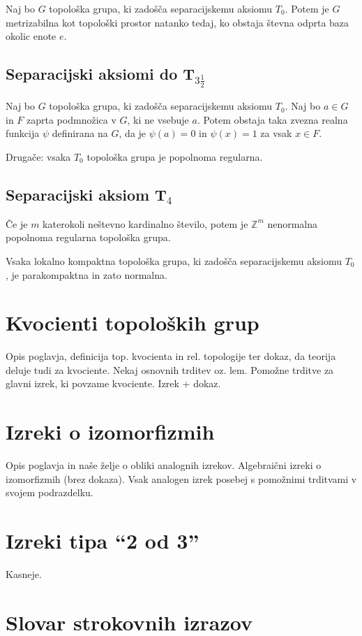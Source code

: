 \documentclass[mat1]{fmfdelo}
\newcommand{\Z}{\mathbb Z}
\begin{document}
\begin{izrek}\label{izr:metrizabilnost}
Naj bo $G$ topološka grupa, ki zadošča separacijskemu aksiomu $T_0$. Potem je $G$ metrizabilna kot topološki prostor natanko tedaj, ko obstaja števna odprta baza okolic enote $e$.
\end{izrek}

\subsection{Separacijski aksiomi do T$_{3 \frac{1}{2}}$}

\begin{izrek}\label{izr:t3pol}
Naj bo $G$ topološka grupa, ki zadošča separacijskemu aksiomu $T_0$. Naj bo $a \in G$ in $F$ zaprta podmnožica v $G$, ki ne vsebuje $a$. Potem obstaja taka zvezna realna funkcija $\psi$ definirana na $G$, da je $\psi (a) = 0$ in $\psi (x) = 1$ za vsak $x \in F$.

Drugače: vsaka $T_0$ topološka grupa je popolnoma regularna.
\end{izrek}

\subsection{Separacijski aksiom T$_4$}
\begin{izrek}\label{izr:t4protiprimer}
Če je $m$ katerokoli neštevno kardinalno število, potem je $\Z^{m}$ nenormalna popolnoma regularna topološka grupa.
\end{izrek}

\begin{izrek}\label{izr:t4}
Vsaka lokalno kompaktna topološka grupa, ki zadošča separacijskemu aksiomu $T_0$, je parakompaktna in zato normalna.
\end{izrek}

\section{Kvocienti topoloških grup}
Opis poglavja, definicija top. kvocienta in rel. topologije ter dokaz, da teorija deluje tudi za kvociente.
Nekaj osnovnih trditev oz. lem.
Pomožne trditve za glavni izrek, ki povzame kvociente.
Izrek + dokaz.

\section{Izreki o izomorfizmih}
Opis poglavja in naše želje o obliki analognih izrekov.
Algebraični izreki o izomorfizmih (brez dokaza).
Vsak analogen izrek posebej s pomožnimi trditvami v svojem podrazdelku.

\section{Izreki tipa ``2 od 3''}
Kasneje.



\section*{Slovar strokovnih izrazov}

\geslo{}{}
\geslo{}{}

\begin{thebibliography}{99}


\end{thebibliography}
\end{document}
